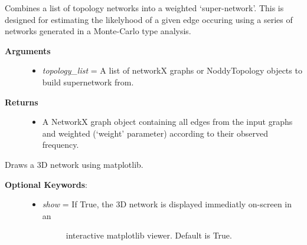 \documentclass[a4paper,10pt,english]{sphinxmanual}
\begin{document}
\begin{fulllineitems}
\begin{fulllineitems}
\begin{description}
\begin{itemize}
\end{itemize}

\end{description}

\end{fulllineitems}


\begin{fulllineitems}
\label{pynoddy:pynoddy.output.NoddyTopology.combine_topologies}
Combines a list of topology networks into a weighted `super-network'. This is designed for
estimating the likelyhood of a given edge occuring using a series of networks generated in
a Monte-Carlo type analysis.
\begin{description}
\item[{\textbf{Arguments}}] \leavevmode\begin{itemize}
\item {} 
\emph{topology\_list} = A list of networkX graphs or NoddyTopology objects to build supernetwork from.

\end{itemize}

\item[{\textbf{Returns}}] \leavevmode\begin{itemize}
\item {} 
A NetworkX graph object containing all edges from the input graphs and weighted (`weight' parameter)
according to their observed frequency.

\end{itemize}

\end{description}

\end{fulllineitems}


\begin{fulllineitems}
\label{pynoddy:pynoddy.output.NoddyTopology.draw_3d_network}
Draws a 3D network using matplotlib.
\begin{description}
\item[{\textbf{Optional Keywords}:}] \leavevmode\begin{itemize}
\item {} \begin{description}
\item[{\emph{show} = If True, the 3D network is displayed immediatly on-screen in an}] \leavevmode
interactive matplotlib viewer. Default is True.


\end{description}
\end{itemize}
\end{description}
\end{fulllineitems}
\end{fulllineitems}
\end{document}
